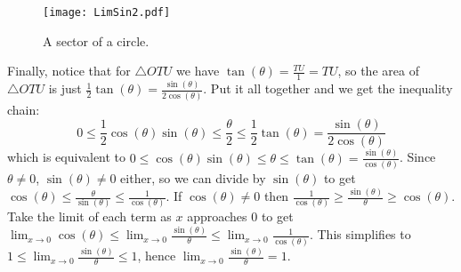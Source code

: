 \documentclass[12pt]{article}
\begin{document}
\begin{wrapfigure}{l}{7cm}
\texttt{[image: LimSin2.pdf]}
\caption{A sector of a circle.} \label{fg:sec}
\end{wrapfigure}
Finally, notice that for $\triangle OTU$ we have 
$\tan(\theta)=\frac{TU}{1}=TU$, so the area of $\triangle OTU$ is just $\frac{1}{2}\tan(\theta)=\frac{\sin(\theta)}{2\cos(\theta)}$.
Put it all together and we get the inequality chain:
\[0 \leq \frac{1}{2}\cos(\theta)\sin(\theta) \leq \frac{\theta}{2} \leq \frac{1}{2}\tan(\theta)=\frac{\sin(\theta)}{2\cos(\theta)}\]
which is equivalent to  $0 \leq \cos(\theta)\sin(\theta) \leq \theta \leq \tan(\theta)=\frac{\sin(\theta)}{\cos(\theta)}$. Since $\theta \neq 0$,  $\sin(\theta) \neq 0$ either, so we can divide by $\sin(\theta)$ to get
$\cos(\theta) \leq \frac{\theta}{\sin(\theta)} \leq \frac{1}{\cos(\theta)}$. If $\cos(\theta) \neq 0$ then $\frac{1}{\cos(\theta)} \geq
 \frac{\sin(\theta)}{\theta} \geq \cos(\theta)$. Take the limit of each term as $x$ approaches $0$ to get 
$\lim_{x \to 0}\cos(\theta) \leq \lim_{x \to 0}\frac{\sin(\theta)}{\theta}  \leq \lim_{x \to 0}\frac{1}{\cos(\theta)}$. This simplifies to 
$1 \leq \lim_{x \to 0}\frac{\sin(\theta)}{\theta} \leq 1$, hence $\lim_{x \to 0}\frac{\sin(\theta)}{\theta} =1$.
\end{document}
